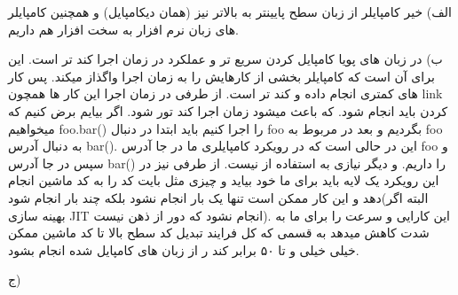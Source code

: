 


الف) خیر کامپایلر از زبان سطح پایینتر به بالاتر نیز (همان دیکامپایل) و همچنین کامپایلر های زبان نرم افزار به سخت افزار هم داریم.

ب) در زبان های پویا کامپایل کردن سریع تر و عملکرد در زمان اجرا کند تر است. \newline
این برای آن است که کامپایلر بخشی از کارهایش را به زمان اجرا واگذاز میکند. پس کار های کمتری انجام داده و کند تر است. از طرفی در زمان اجرا این کار ها همچون link کردن باید انجام شود. که باعث میشود زمان اجرا کند تور شود.\newline
اگر بیایم برض کنیم که میخواهیم foo.bar() را اجرا کنیم باید ابتدا در  دنبال foo بگردیم و بعد در  مربوط به foo به دنبال آدرس bar(). این در حالی است که در رویکرد کامپایلری ما در جا آدرس foo و سپس در جا آدرس bar() را داریم. و دیگر نیازی به استفاده از  نیست. از طرفی نیز در این رویکرد یک لایه باید برای ما خود بیاید و چیزی مثل بایت کد را به کد ماشین انجام دهد و این کار ممکن است تنها یک بار انجام نشود بلکه چند بار انجام شود(البته اگر بهینه سازی JIT انجام نشود که دور از ذهن نیست). این کارایی و سرعت را برای ما به شدت کاهش میدهد به قسمی که کل فرایند تبدیل کد سطح بالا تا کد ماشین ممکن خیلی خیلی و تا ۵۰ برابر کند ر از زبان های کامپایل شده انجام بشود. \newline

ج) 

\begin{latin}
\end{latin}
